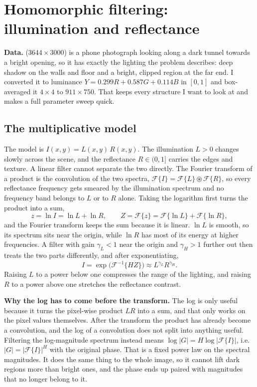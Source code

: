 \section{Homomorphic filtering: illumination and reflectance}

\textbf{Data.}  ($3644\times3000$) is a phone photograph
looking along a dark tunnel towards a bright opening, so it has exactly the
lighting the problem describes: deep shadow on the walls and floor and a bright,
clipped region at the far end. I converted it to luminance
$Y=0.299R+0.587G+0.114B$ in $[0,1]$ and box-averaged it $4\times4$ to
$911\times750$. That keeps every structure I want to look at and makes a full
parameter sweep quick.

\subsection{The multiplicative model}

The model \cite{gonzalez} is $I(x,y)=L(x,y)\,R(x,y)$. The illumination $L>0$
changes slowly across the scene, and the reflectance $R\in(0,1]$ carries the
edges and texture. A linear filter cannot separate the two directly. The
Fourier transform of a product is the convolution of the two spectra,
$\mathcal F\{I\}=\mathcal F\{L\}\circledast\mathcal F\{R\}$, so every
reflectance frequency gets smeared by the illumination spectrum and no frequency
band belongs to $L$ or to $R$ alone. Taking the logarithm first turns the
product into a sum,
\begin{equation}
z=\ln I=\ln L+\ln R,\qquad Z=\mathcal F\{z\}=\mathcal F\{\ln L\}+\mathcal F\{\ln R\},
\end{equation}
and the Fourier transform keeps the sum because it is linear. $\ln L$ is smooth,
so its spectrum sits near the origin, while $\ln R$ has most of its energy at
higher frequencies. A filter with gain $\gamma_L<1$ near the origin and
$\gamma_H>1$ further out then treats the two parts differently, and after
exponentiating,
\begin{equation}
\hat I=\exp\big(\mathcal F^{-1}\{HZ\}\big)\approx L^{\gamma_L}R^{\gamma_H}.
\end{equation}
Raising $L$ to a power below one compresses the range of the lighting, and
raising $R$ to a power above one stretches the reflectance contrast.

\textbf{Why the log has to come before the transform.} The log is only useful
because it turns the pixel-wise product $LR$ into a sum, and that only works on
the pixel values themselves. After the transform the product has already become
a convolution, and the log of a convolution does not split into anything useful.
Filtering the log-magnitude spectrum instead means
$\log|G|=H\log|\mathcal F\{I\}|$, i.e.\ $|G|=|\mathcal F\{I\}|^{H}$ with the
original phase. That is a fixed power law on the spectral magnitudes. It does the
same thing to the whole image, so it cannot lift dark regions more than bright
ones, and the phase ends up paired with magnitudes that no longer belong to it.

